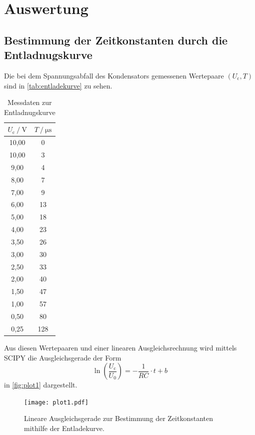 \section{Auswertung}
\label{sec:Auswertung}

\subsection{Bestimmung der Zeitkonstanten durch die Entladnugskurve}

Die bei dem Spannungsabfall des Kondensators gemessenen Wertepaare $(U_\text{c}, T)$ sind in \autoref{tab:entladekurve} zu sehen. 
\begin{table} [h]
  \centering
  \caption{Messdaten zur Entladnugskurve}
  \label{tab:entladekurve}
  \begin{tabular}{c c}
    \toprule
    $U_\text{c} \mathbin{/} \unit{\volt}$ &  $T \mathbin{/} \unit{\micro\second}$ \\
    \midrule
    10,00 &     0 \\
    10,00 &     3 \\
     9,00 &     4 \\
     8,00 &     7 \\
     7,00 &     9 \\
     6,00 &    13 \\
     5,00 &    18 \\
     4,00 &    23 \\
     3,50 &    26 \\
     3,00 &    30 \\
     2,50 &    33 \\
     2,00 &    40 \\
     1,50 &    47 \\
     1,00 &    57 \\
     0,50 &    80 \\
     0,25 &   128 \\
    \bottomrule
    \end{tabular}
\end{table}

Aus diesen Wertepaaren und einer linearen Ausgleichsrechnung wird mittels SCIPY \cite{scipy} die Ausgleichsgerade der Form
\begin{equation*}
  \ln \left(\frac{U_\text{c}}{U_{0}}\right) = - \frac{1}{RC} \cdot t + b
\end{equation*}
in \autoref{fig:plot1} dargestellt.
\begin{figure}[H]
  \centering
  \texttt{[image: plot1.pdf]}
  \caption{Lineare Ausgleichsgerade zur Bestimmung der Zeitkonstanten mithilfe der Entladekurve.}
  \label{fig:plot1}
\end{figure}

